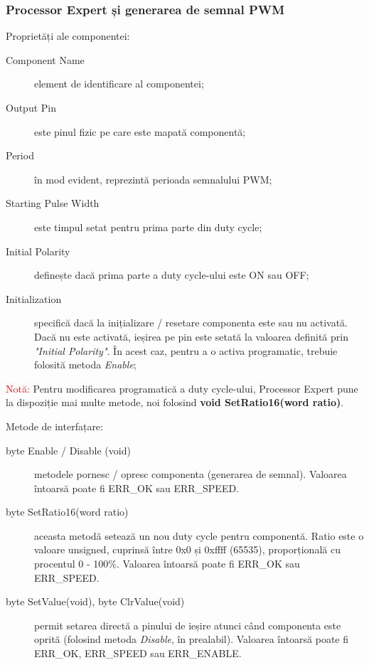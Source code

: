 \subsubsection{Processor Expert și generarea de semnal PWM}

Proprietăți ale componentei:

\begin{description}
    \item[Component Name] element de identificare al componentei;
    \item[Output Pin] este pinul fizic pe care este mapată componentă;
    \item[Period] în mod evident, reprezintă perioada semnalului PWM;
    \item[Starting Pulse Width] este timpul setat pentru prima parte din duty cycle; 
    \item[Initial Polarity] definește dacă prima parte a duty cycle-ului este ON sau OFF;
    \item[Initialization] specifică dacă la inițializare / resetare componenta este sau nu activată. Dacă nu este activată, ieșirea pe pin este setată la valoarea definită prin \textit{"Initial Polarity"}. În acest caz, pentru a o activa programatic, trebuie folosită metoda \textit{Enable}; 
\end{description}

\textcolor{red}{Notă:} Pentru modificarea programatică a duty cycle-ului, Processor Expert pune la dispoziție mai multe metode, noi folosind \textbf{void SetRatio16(word ratio)}.

Metode de interfațare:

\begin{description}
    \item[byte Enable / Disable (void)] metodele pornesc / opresc componenta (generarea de semnal). Valoarea întoarsă poate fi ERR\_OK sau ERR\_SPEED.
    \item[byte SetRatio16(word ratio)] aceasta metodă setează un nou duty cycle pentru componentă. Ratio este o valoare unsigned, cuprinsă între 0x0 și 0xffff (65535), proporțională cu procentul 0 - 100\%. Valoarea întoarsă poate fi ERR\_OK sau ERR\_SPEED.
    \item[byte SetValue(void), byte ClrValue(void)] permit setarea directă a pinului de ieșire atunci când componenta este oprită (folosind metoda \textit{Disable}, în prealabil). Valoarea întoarsă poate fi ERR\_OK, ERR\_SPEED sau ERR\_ENABLE.
\end{description}

